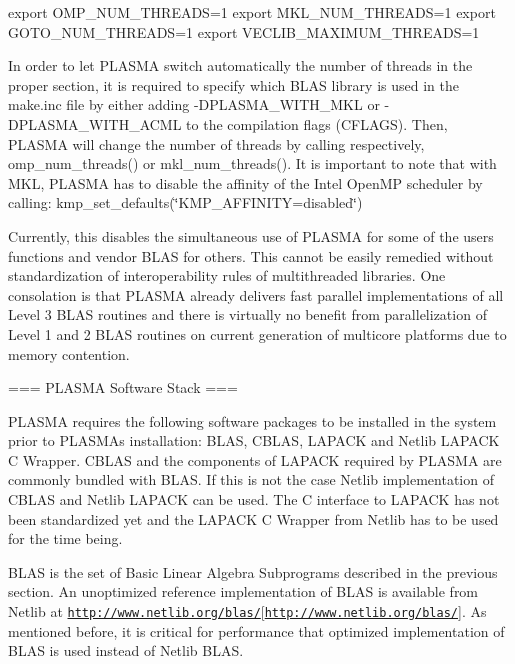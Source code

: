 export O\+M\+P\+\_\+\+N\+U\+M\+\_\+\+T\+H\+R\+E\+A\+D\+S=1 export M\+K\+L\+\_\+\+N\+U\+M\+\_\+\+T\+H\+R\+E\+A\+D\+S=1 export G\+O\+T\+O\+\_\+\+N\+U\+M\+\_\+\+T\+H\+R\+E\+A\+D\+S=1 export V\+E\+C\+L\+I\+B\+\_\+\+M\+A\+X\+I\+M\+U\+M\+\_\+\+T\+H\+R\+E\+A\+D\+S=1

In order to let P\+L\+A\+S\+M\+A switch automatically the number of threads in the proper section, it is required to specify which B\+L\+A\+S library is used in the make.\+inc file by either adding -\/\+D\+P\+L\+A\+S\+M\+A\+\_\+\+W\+I\+T\+H\+\_\+\+M\+K\+L or -\/\+D\+P\+L\+A\+S\+M\+A\+\_\+\+W\+I\+T\+H\+\_\+\+A\+C\+M\+L to the compilation flags (C\+F\+L\+A\+G\+S). Then, P\+L\+A\+S\+M\+A will change the number of threads by calling respectively, omp\+\_\+num\+\_\+threads() or mkl\+\_\+num\+\_\+threads(). It is important to note that with M\+K\+L, P\+L\+A\+S\+M\+A has to disable the affinity of the Intel Open\+M\+P scheduler by calling\+: kmp\+\_\+set\+\_\+defaults(\char`\"{}\+K\+M\+P\+\_\+\+A\+F\+F\+I\+N\+I\+T\+Y=disabled\char`\"{})

Currently, this disables the simultaneous use of P\+L\+A\+S\+M\+A for some of the user\textquotesingle{}s functions and vendor B\+L\+A\+S for others. This cannot be easily remedied without standardization of interoperability rules of multithreaded libraries. One consolation is that P\+L\+A\+S\+M\+A already delivers fast parallel implementations of all Level 3 B\+L\+A\+S routines and there is virtually no benefit from parallelization of Level 1 and 2 B\+L\+A\+S routines on current generation of multicore platforms due to memory contention.

=== P\+L\+A\+S\+M\+A Software Stack ===

P\+L\+A\+S\+M\+A requires the following software packages to be installed in the system prior to P\+L\+A\+S\+M\+A\textquotesingle{}s installation\+: B\+L\+A\+S, C\+B\+L\+A\+S, L\+A\+P\+A\+C\+K and Netlib L\+A\+P\+A\+C\+K C Wrapper. C\+B\+L\+A\+S and the components of L\+A\+P\+A\+C\+K required by P\+L\+A\+S\+M\+A are commonly bundled with B\+L\+A\+S. If this is not the case Netlib implementation of C\+B\+L\+A\+S and Netlib L\+A\+P\+A\+C\+K can be used. The C interface to L\+A\+P\+A\+C\+K has not been standardized yet and the L\+A\+P\+A\+C\+K C Wrapper from Netlib has to be used for the time being.

B\+L\+A\+S is the set of Basic Linear Algebra Subprograms described in the previous section. An unoptimized reference implementation of B\+L\+A\+S is available from Netlib at \href{http://www.netlib.org/blas/}{\tt http\+://www.\+netlib.\+org/blas/}\mbox{[}\href{http://www.netlib.org/blas/}{\tt http\+://www.\+netlib.\+org/blas/}\mbox{]}. As mentioned before, it is critical for performance that optimized implementation of B\+L\+A\+S is used instead of Netlib B\+L\+A\+S.

